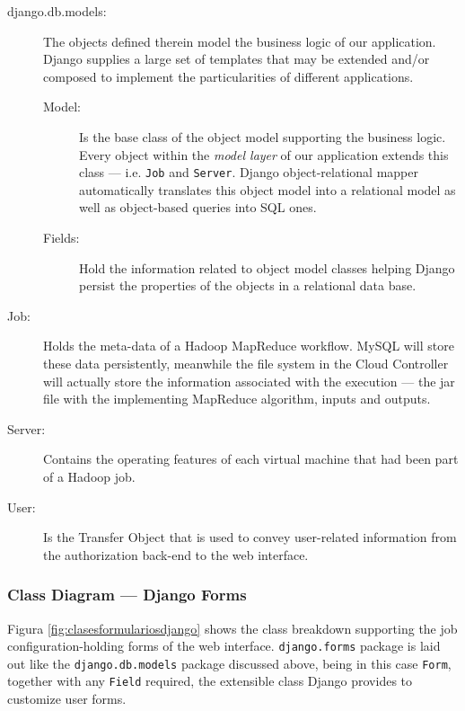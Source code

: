 \begin{description}
 \item[django.db.models:] The objects defined therein model the business logic of our application. Django supplies a large set of templates that may be extended and/or composed to implement the particularities of different applications.
  \begin{description}
   \item[Model:] Is the base class of the object model supporting the business logic. Every object within the \emph{model layer} of our application extends this class --- i.e. \texttt{Job} and \texttt{Server}. Django object-relational mapper automatically translates this object model into a relational model as well as object-based queries into SQL ones.
   \item[Fields:] Hold the information related to object model classes helping Django persist the properties of the objects in a relational data base.
  \end{description}
 \item[Job:] Holds the meta-data of a Hadoop MapReduce workflow. MySQL will store these data persistently, meanwhile the file system in the Cloud Controller will actually store the information associated with the execution --- the jar file with the implementing MapReduce algorithm, inputs and outputs.
 \item[Server:] Contains the operating features of each virtual machine that had been part of a Hadoop job.
 \item[User:] Is the {Transfer Object} that is used to convey user-related information from the authorization back-end to the web interface.
\end{description}

\subsubsection{Class Diagram --- Django Forms}\label{subsubsec:clasesformulariosdjango}
\noindent Figura \ref{fig:clasesformulariosdjango} shows the class breakdown supporting the job configuration-holding forms of the web interface. \texttt{django.forms} package is laid out like the \texttt{django.db.models} package discussed above, being in this case \texttt{Form}, together with any \texttt{Field} required, the extensible class Django provides to customize user forms.


